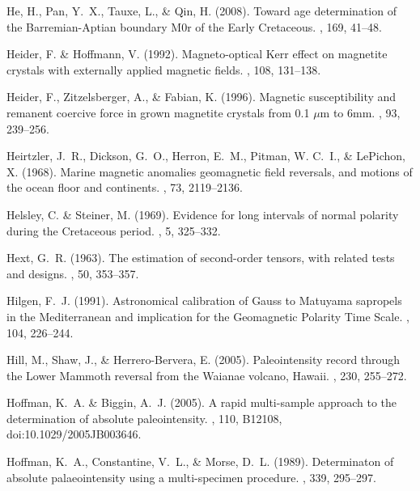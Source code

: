 He, H., Pan, Y.~X., Tauxe, L., \& Qin, H. (2008).
\newblock Toward age determination of the Barremian-Aptian boundary M0r of the
  Early Cretaceous.
, 169, 41--48.

Heider, F. \& Hoffmann, V. (1992).
\newblock Magneto-optical Kerr effect on magnetite crystals with externally
  applied magnetic fields.
, 108, 131--138.

Heider, F., Zitzelsberger, A., \& Fabian, K. (1996).
\newblock Magnetic susceptibility and remanent coercive force in grown
  magnetite crystals from 0.1 $\mu$m to 6mm.
, 93, 239--256.

Heirtzler, J.~R., Dickson, G.~O., Herron, E.~M., Pitman, W. C.~I., \& LePichon,
  X. (1968).
\newblock Marine magnetic anomalies geomagnetic field reversals, and motions of
  the ocean floor and continents.
, 73, 2119--2136.

Helsley, C. \& Steiner, M. (1969).
\newblock Evidence for long intervals of normal polarity during the Cretaceous
  period.
, 5, 325--332.

Hext, G.~R. (1963).
\newblock The estimation of second-order tensors, with related tests and
  designs.
, 50, 353--357.

Hilgen, F.~J. (1991).
\newblock Astronomical calibration of Gauss to Matuyama sapropels in the
  Mediterranean and implication for the Geomagnetic Polarity Time Scale.
, 104, 226--244.

Hill, M., Shaw, J., \& Herrero-Bervera, E. (2005).
\newblock Paleointensity record through the Lower Mammoth reversal from the
  Waianae volcano, Hawaii.
, 230, 255--272.

Hoffman, K.~A. \& Biggin, A.~J. (2005).
\newblock A rapid multi-sample approach to the determination of absolute
  paleointensity.
, 110, B12108, doi:10.1029/2005JB003646.

Hoffman, K.~A., Constantine, V.~L., \& Morse, D.~L. (1989).
\newblock Determinaton of absolute palaeointensity using a multi-specimen
  procedure.
, 339, 295--297.

